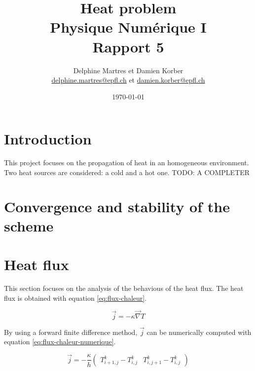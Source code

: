 \documentclass[a4paper,12pt,twoside]{article}
\newcommand{\mail}[1]{{\href{mailto:#1}{#1}}}
\begin{document}
\title{Heat problem\\{\small Physique Numérique I}\\{\small Rapport 5}}
\date{\today}
\author{Delphine Martres et Damien Korber\\{\small \mail{delphine.martres@epfl.ch} et \mail{damien.korber@epfl.ch}}}

\maketitle
\tableofcontents %


\baselineskip=16pt
\parindent=15pt
\parskip=5pt
\newpage



\section{Introduction}
This project focuses on the propagation of heat in an homogeneous environment.
Two heat sources are considered: a cold and a hot one.
TODO: A COMPLETER

\section{Convergence and stability of the scheme}

\section{Heat flux}
This section focuses on the analysis of the behavious of the heat flux.
The heat flux is obtained with equation \eqref{eq:flux-chaleur}.

\begin{equation}
  \vec{j} = -\kappa\vec{\nabla} T
  \label{eq:flux-chaleur}
\end{equation}

By using a forward finite difference method, $\vec{j}$ can be numerically computed with equation \eqref{eq:flux-chaleur-numerique}.

\begin{equation}
  \vec{j} = -\frac{\kappa}{h}
  \begin{pmatrix}
    T^k_{i+1,j} - T^k_{i,j} & T^k_{i,j+1} - T^k_{i,j}
  \end{pmatrix}
  \label{eq:flux-chaleur-numerique}
\end{equation}
\end{document}

